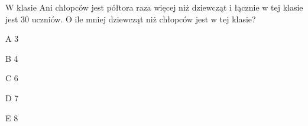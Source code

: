 \begin{tresc}
W klasie Ani chłopców jest półtora raza więcej niż dziewcząt i łącznie w tej klasie jest 30 uczniów. O ile mniej dziewcząt niż chłopców jest w tej klasie?
\end{tresc}
\begin{wariant}{A} 3 \end{wariant}
\begin{wariant}{B} 4 \end{wariant}
\begin{wariant}{C} 6 \end{wariant}
\begin{wariant}{D} 7 \end{wariant}
\begin{wariant}{E} 8 \end{wariant}

